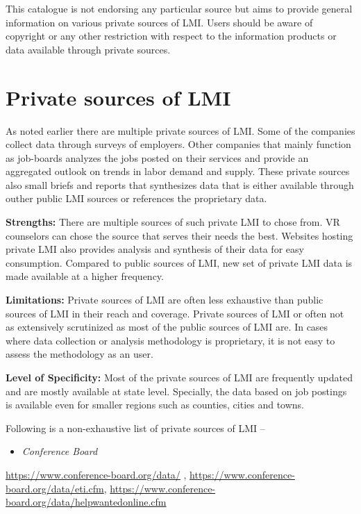 \documentclass[]{book}
\providecommand{\tightlist}{%
  \setlength{\itemsep}{0pt}\setlength{\parskip}{0pt}}
\theoremstyle{definition}
\theoremstyle{definition}
\theoremstyle{definition}
\theoremstyle{remark}
\begin{document}
This catalogue is not endorsing any particular source but aims to
provide general information on various private sources of LMI. Users
should be aware of copyright or any other restriction with respect to
the information products or data available through private sources.

\section{Private sources of LMI}\label{private-sources-of-lmi-1}

As noted earlier there are multiple private sources of LMI. Some of the
companies collect data through surveys of employers. Other companies
that mainly function as job-boards analyzes the jobs posted on their
services and provide an aggregated outlook on trends in labor demand and
supply. These private sources also small briefs and reports that
synthesizes data that is either available through outher public LMI
sources or references the proprietary data.

\textbf{Strengths:} There are multiple sources of such private LMI to
chose from. VR counselors can chose the source that serves their needs
the best. Websites hosting private LMI also provides analysis and
synthesis of their data for easy consumption. Compared to public sources
of LMI, new set of private LMI data is made available at a higher
frequency.

\textbf{Limitations:} Private sources of LMI are often less exhaustive
than public sources of LMI in their reach and coverage. Private sources
of LMI or often not as extensively scrutinized as most of the public
sources of LMI are. In cases where data collection or analysis
methodology is proprietary, it is not easy to assess the methodology as
an user.

\textbf{Level of Specificity:} Most of the private sources of LMI are
frequently updated and are mostly available at state level. Specially,
the data based on job postings is available even for smaller regions
such as counties, cities and towns.

Following is a non-exhaustive list of private sources of LMI --

\begin{itemize}
\tightlist
\item
  \emph{Conference Board}
\end{itemize}

\url{https://www.conference-board.org/data/} ,
\url{https://www.conference-board.org/data/eti.cfm},
\url{https://www.conference-board.org/data/helpwantedonline.cfm}
\end{document}
